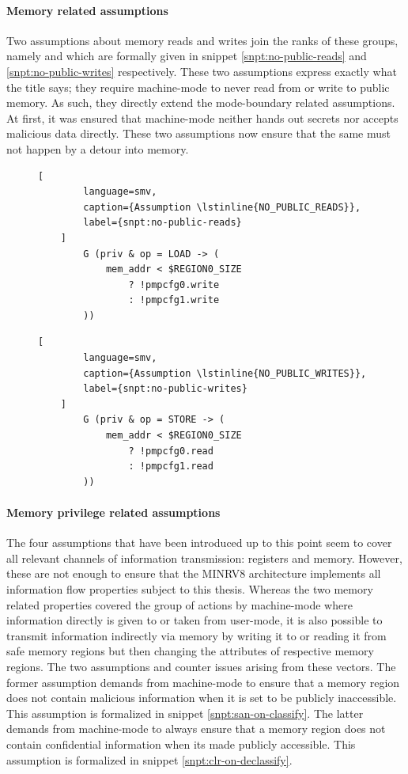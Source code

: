 \paragraph{Memory related assumptions}
Two assumptions about memory reads and writes join the ranks of these groups, namely  and  which are formally given in snippet \ref{snpt:no-public-reads} and \ref{snpt:no-public-writes} respectively.
These two assumptions express exactly what the title says; they require machine-mode to never read from or write to public memory.
As such, they directly extend the mode-boundary related assumptions.
At first, it was ensured that machine-mode neither hands out secrets nor accepts malicious data directly.
These two assumptions now ensure that the same must not happen by a detour into memory.

\begin{figure}
    \begin{lstlisting}[
        language=smv,
        caption={Assumption \lstinline{NO_PUBLIC_READS}},
        label={snpt:no-public-reads}
    ]
        G (priv & op = LOAD -> (
            mem_addr < $REGION0_SIZE
                ? !pmpcfg0.write
                : !pmpcfg1.write
        ))
    \end{lstlisting}

    \begin{lstlisting}[
        language=smv,
        caption={Assumption \lstinline{NO_PUBLIC_WRITES}},
        label={snpt:no-public-writes}
    ]
        G (priv & op = STORE -> (
            mem_addr < $REGION0_SIZE
                ? !pmpcfg0.read
                : !pmpcfg1.read
        ))
    \end{lstlisting}
\end{figure}

\paragraph{Memory privilege related assumptions}
The four assumptions that have been introduced up to this point seem to cover all relevant channels of information transmission: registers and memory.
However, these are not enough to ensure that the MINRV8 architecture implements all information flow properties subject to this thesis.
Whereas the two memory related properties covered the group of actions by machine-mode where information directly is given to or taken from user-mode, it is also possible to transmit information indirectly via memory by writing it to or reading it from safe memory regions but then changing the attributes of respective memory regions.
The two assumptions  and  counter issues arising from these vectors.
The former assumption demands from machine-mode to ensure that a memory region does not contain malicious information when it is set to be publicly inaccessible.
This assumption is formalized in snippet \ref{snpt:san-on-classify}.
The latter demands from machine-mode to always ensure that a memory region does not contain confidential information when its made publicly accessible.
This assumption is formalized in snippet \ref{snpt:clr-on-declassify}.

